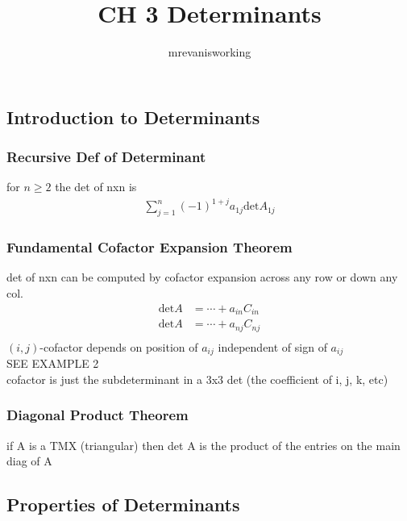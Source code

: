 \documentclass[12pt]{article}
\begin{document}
\title{CH 3 Determinants}
\author{mrevanisworking}
\maketitle

\subsection{Introduction to Determinants}
    \subsubsection{Recursive Def of Determinant}
        for $n\ge 2$  the det of nxn is
        \begin{align*}
            \sum_{j= 1}^{n}(-1)^{1+ j} a_{1j}\text{det} A_{1j}
        \end{align*}
    \subsubsection{Fundamental Cofactor Expansion Theorem}
        det of nxn can be computed by cofactor expansion across any row
        or down any col.
        \begin{align*}
            \text{det} A &= \cdots+ a_{in}C_{in} \\
            \text{det} A &= \cdots+ a_{nj}C_{nj} \\
        \end{align*}
        $(i, j)$-cofactor depends on position of $a_{ij}$  independent of 
        sign of $a_{ij}$ \\
        SEE EXAMPLE 2 \\
        cofactor is just the subdeterminant in a 3x3 det (the coefficient
        of i, j, k, etc)
    \subsubsection{Diagonal Product Theorem}
        if A is a TMX (triangular) then det A is the product of the
        entries on the main diag of A
\subsection{Properties of Determinants}
\end{document}
